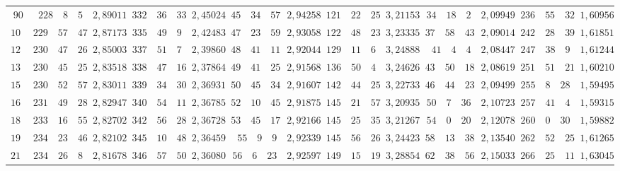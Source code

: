 \begin{landscape}
\begin{center}
\begin{tabular}{r|r|r|r|r|r|r|r|r|r|r|r|r}
\(90\) & \(228\quad 8\quad 5\) & \(2{,}89011\) & \(332\quad 36\quad 33\) & \(2{,}45024\) & \(45\quad 34\quad 57\) & \(2{,}94258\) & \(121\quad 22\quad 25\) & \(3{,}21153\) & \(34\quad 18\quad 2\) & \(2{,}09949\) & \(236\quad 55\quad 32\) & \(1{,}60956\) \\
\(105\) & \(229\quad 57\quad 47\) & \(2{,}87173\) & \(335\quad 49\quad 9\) & \(2{,}42483\) & \(47\quad 23\quad 59\) & \(2{,}93058\) & \(122\quad 48\quad 23\) & \(3{,}23335\) & \(37\quad 58\quad 43\) & \(2{,}09014\) & \(242\quad 28\quad 39\) & \(1{,}61851\) \\[3pt]
\(120\) & \(230\quad 47\quad 26\) & \(2{,}85003\) & \(337\quad 51\quad 7\) & \(2{,}39860\) & \(48\quad 41\quad 11\) & \(2{,}92044\) & \(129\quad 11\quad 6\) & \(3{,}24888\) & \(41\quad 4\quad 4\) & \(2{,}08447\) & \(247\quad 38\quad 9\) & \(1{,}61244\) \\
\(135\) & \(230\quad 45\quad 25\) & \(2{,}83518\) & \(338\quad 47\quad 16\) & \(2{,}37864\) & \(49\quad 41\quad 25\) & \(2{,}91568\) & \(136\quad 50\quad 4\) & \(3{,}24626\) & \(43\quad 50\quad 18\) & \(2{,}08619\) & \(251\quad 51\quad 21\) & \(1{,}60210\) \\
\(150\) & \(230\quad 52\quad 57\) & \(2{,}83011\) & \(339\quad 34\quad 30\) & \(2{,}36931\) & \(50\quad 45\quad 34\) & \(2{,}91607\) & \(142\quad 44\quad 25\) & \(3{,}22733\) & \(46\quad 44\quad 23\) & \(2{,}09499\) & \(255\quad 8\quad 28\) & \(1{,}59495\) \\
\(165\) & \(231\quad 49\quad 28\) & \(2{,}82947\) & \(340\quad 54\quad 11\) & \(2{,}36785\) & \(52\quad 10\quad 45\) & \(2{,}91875\) & \(145\quad 21\quad 57\) & \(3{,}20935\) & \(50\quad 7\quad 36\) & \(2{,}10723\) & \(257\quad 41\quad 4\) & \(1{,}59315\) \\[3pt]
\(180\) & \(233\quad 16\quad 55\) & \(2{,}82702\) & \(342\quad 56\quad 28\) & \(2{,}36728\) & \(53\quad 45\quad 17\) & \(2{,}92166\) & \(145\quad 25\quad 35\) & \(3{,}21267\) & \(54\quad 0\quad 20\) & \(2{,}12078\) & \(260\quad 0\quad 30\) & \(1{,}59882\) \\
\(195\) & \(234\quad 23\quad 46\) & \(2{,}82102\) & \(345\quad 10\quad 48\) & \(2{,}36459\) & \(55\quad 9\quad 9\) & \(2{,}92339\) & \(145\quad 56\quad 26\) & \(3{,}24423\) & \(58\quad 13\quad 38\) & \(2{,}13540\) & \(262\quad 52\quad 25\) & \(1{,}61265\) \\
\(210\) & \(234\quad 26\quad 8\) & \(2{,}81678\) & \(346\quad 57\quad 50\) & \(2{,}36080\) & \(56\quad 6\quad 23\) & \(2{,}92597\) & \(149\quad 15\quad 19\) & \(3{,}28854\) & \(62\quad 38\quad 56\) & \(2{,}15033\) & \(266\quad 25\quad 11\) & \(1{,}63045\) \\

\end{tabular}
\end{center}
\end{landscape}
